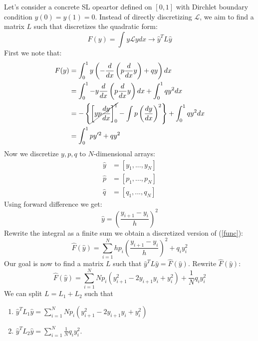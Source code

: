 Let's consider a concrete SL opeartor defined on $[0,1]$ with Dirchlet boundary condition $y(0)=y(1)=0$. Instead of directly discretizing $\mathcal L$, we aim to find a matrix $L$ such that discretizes the quadratic form:
\begin{equation}
F(y)=\int y\mathcal Ly dx \rightarrow \hat y^TL\hat y
\end{equation}
First we note that:
\begin{equation}
\label{func}
\begin{aligned}
F(y) &= \int_0^1 y\left(-\frac{d}{dx}\left(p\frac{d}{dx}y\right) + qy\right) dx \\
&= \int_0^1 -y \frac{d}{dx}\left(p\frac{d}{dx}y\right)dx+\int_0^1 qy^2dx  \\
&= -\left\{\cancel{\left[yp\frac{dy}{dx}\right]_0^1} - \int p\left(\frac{dy}{dx}\right)^2 \right\} + \int_0^1 qy^2dx \\
&= \int_0^1 py'^2 + qy^2
\end{aligned}
\end{equation}
Now we discretize $y, p, q$ to $N$-dimensional arrays:
\begin{equation}
\begin{aligned}
\hat y &= [y_1,...,y_N] \\
\hat p &= [p_1,...,p_N] \\
\hat q &= [q_1,...,q_N]
\end{aligned}
\end{equation}
Using forward difference we get:
\begin{equation}
\hat y =\left(\frac{y_{i+1}-y_i}{h}\right)^2
\end{equation}
Rewrite the integral as a finite sum we obtain a discretized version of (\ref{func}):
\begin{equation}
\boxed{\hat F(\hat y)=\sum_{i=1}^N h p_i\left(\frac{y_{i+1}-y_i}{h}\right)^2 +q_iy_i^2}
\end{equation}
Our goal is now to find a matrix $L$ such that $\hat y^TL\hat y=\hat F(\hat y)$. Rewrite $\hat F(\hat y)$:
\begin{equation}
\hat F(\hat y) =\sum_{i=1}^N Np_i(y_{i+1}^2 -2y_{i+1}y_i +y_i^2)+\frac{1}{N}q_iy_i^2
\end{equation}
We can split $L=L_1+L_2$ such that

\begin{enumerate}
\item $\hat y^T L_1 \hat y = \sum_{i=1}^N Np_i(y_{i+1}^2 -2y_{i+1}y_i +y_i^2)$
\item $\hat y^T L_2 \hat y = \sum_{i=1}^N \frac{1}{N}q_iy_i^2$.
\end{enumerate}

